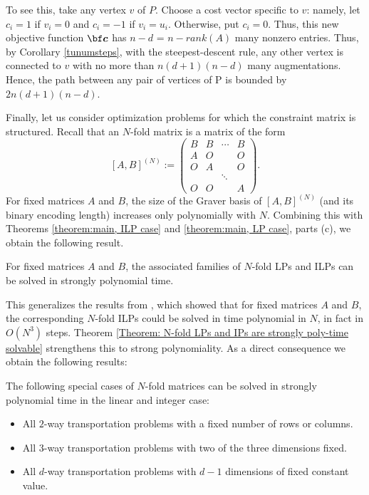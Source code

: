 \documentclass[moor]{informs1hack}              %
\def\ve#1{\mathchoice{\mbox{\boldmath$\displaystyle\bf#1$}}
{\mbox{\boldmath$\textstyle\bf#1$}}
{\mbox{\boldmath$\scriptstyle\bf#1$}}
{\mbox{\boldmath$\scriptscriptstyle\bf#1$}}}
\newcommand\vecc{{\ve c}}
\newcommand{\maO}{O}            %
\begin{document}
 To see this, take any vertex $v$ of $P$. Choose a cost vector specific to $v$: namely, let $c_i=1$ if $v_i=0$ and $c_i=-1$ if $v_i=u_i$. Otherwise, put $c_i=0$. Thus, this new objective function $\vecc$ has $n-d$ = $n-rank(A)$ many nonzero entries. Thus, by Corollary \ref{tunumsteps}, with the steepest-descent rule, any other vertex is connected to $v$ with no more than $n(d+1)(n-d)$ many augmentations. Hence,  the path between any pair of vertices of P is bounded by $2n(d+1)(n-d)$. \Halmos
\endproof

Finally, let us consider optimization problems for which the constraint matrix is structured. Recall that an $N$-fold matrix is a matrix of the form
\[
  [A,B]^{(N)}:=\begin{pmatrix}
    B & B & \cdots & B \\
    A & \maO  &   & \maO  \\
    \maO  & A &   & \maO  \\
       &   & \ddots &   \\
    \maO  & \maO  &   & A
  \end{pmatrix}.
\]
For fixed matrices $A$ and $B$, the size of the Graver basis of $[A,B]^{(N)}$ (and its binary encoding length) increases only polynomially with $N$. Combining this with Theorems \ref{theorem:main, ILP case} and \ref{theorem:main, LP case}, parts (c), we obtain the following result.

\begin{theorem}\label{Theorem: N-fold LPs and IPs are strongly poly-time solvable}
  For fixed matrices $A$ and $B$, the associated families of $N$-fold LPs and ILPs can be solved in strongly polynomial time.
\end{theorem}

This generalizes the results from \cite{hemmecke-onn-romanchuk:nfold-cubic,Hemmecke+Onn+Weismantel:oracle}, which showed that for fixed matrices $A$ and $B$, the corresponding $N$-fold ILPs could be solved in time polynomial in $N$, in fact in $O(N^3)$ steps. Theorem \ref {Theorem: N-fold LPs and IPs are strongly poly-time solvable} strengthens this to strong polynomiality. As a direct consequence we obtain the following results:

\begin{corollary} The following special cases of $N$-fold matrices can be solved in strongly polynomial time in the linear and integer case:
  \begin{itemize}
    \item All $2$-way transportation problems with a fixed number of rows or columns.
    \item All $3$-way transportation problems with two of the three dimensions fixed.
    \item All $d$-way transportation problems with $d-1$ dimensions of fixed constant value.
  \end{itemize}
\end{corollary}
\end{document}
